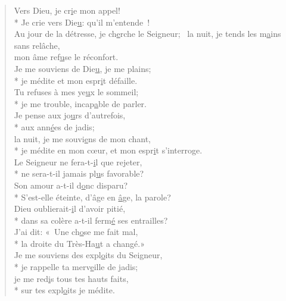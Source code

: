 
\begin{verse}
Vers Dieu, je cr\underline{i}e mon appel! \\*
Je crie vers Die\underline{u}: qu’il m’entende ! \\

Au jour de la détresse, je ch\underline{e}rche le Seigneur;~\psalmdagger
la nuit, je tends les m\underline{a}ins sans relâche, \\
mon âme ref\underline{u}se le réconfort. \\

Je me souviens de Die\underline{u}, je me plains; \\*
je médite et mon espr\underline{i}t défaille. \\
Tu refuses à mes ye\underline{u}x le sommeil; \\*
je me trouble, incap\underline{a}ble de parler. \\

Je pense aux jo\underline{u}rs d’autrefois, \\*
aux ann\underline{é}es de jadis; \\
la nuit, je me souvi\underline{e}ns de mon chant, \\*
je médite en mon cœur, et mon espr\underline{i}t s’interroge. \\

Le Seigneur ne fera-t-\underline{i}l que rejeter, \\*
ne sera-t-il jamais pl\underline{u}s favorable? \\
Son amour a-t-il d\underline{o}nc disparu? \\*
S’est-elle éteinte, d’âge en \underline{â}ge, la parole? \\

Dieu oublierait-\underline{i}l d’avoir pitié, \\*
dans sa colère a-t-il ferm\underline{é} ses entrailles? \\
J’ai dit: « Une ch\underline{o}se me fait mal, \\*
la droite du Très-Ha\underline{u}t a changé.» \\

Je me souviens des expl\underline{o}its du Seigneur, \\*
je rappelle ta merv\underline{e}ille de jadis; \\
je me red\underline{i}s tous tes hauts faits, \\*
sur tes expl\underline{o}its je médite. \\


\end{verse}

